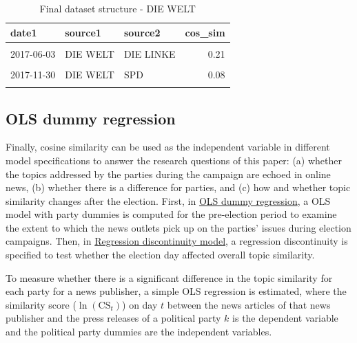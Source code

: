 \documentclass[
  12pt,
]{article}
\begin{document}
\begin{table}[H]

\caption{\label{tab:Dataset structure final}Final dataset structure - DIE WELT \label{table:dataset_structure_final}}
\centering
\fontsize{7}{9}\selectfont
\begin{tabular}[t]{lllr}
\toprule
date1 & source1 & source2 & cos\_sim\\
\midrule
\cellcolor{gray!6}{2017-10-24} & \cellcolor{gray!6}{DIE WELT} & \cellcolor{gray!6}{SPD} & \cellcolor{gray!6}{0.09}\\
2017-06-03 & DIE WELT & DIE LINKE & 0.21\\
\cellcolor{gray!6}{2017-10-09} & \cellcolor{gray!6}{DIE WELT} & \cellcolor{gray!6}{DIE LINKE} & \cellcolor{gray!6}{0.13}\\
2017-11-30 & DIE WELT & SPD & 0.08\\
\cellcolor{gray!6}{2018-01-14} & \cellcolor{gray!6}{DIE WELT} & \cellcolor{gray!6}{CDU} & \cellcolor{gray!6}{0.13}\\
\bottomrule
\end{tabular}
\end{table}

\hypertarget{ols-dummy-regression}{%
\subsection{OLS dummy regression}\label{ols-dummy-regression}}

Finally, cosine similarity can be used as the independent variable in
different model specifications to answer the research questions of this
paper: (a) whether the topics addressed by the parties during the
campaign are echoed in online news, (b) whether there is a difference
for parties, and (c) how and whether topic similarity changes after the
election. First, in \protect\hyperlink{ols-dummy-regression}{OLS dummy
regression}, a OLS model with party dummies is computed for the
pre-election period to examine the extent to which the news outlets pick
up on the parties' issues during election campaigns. Then, in
\protect\hyperlink{regression-discontinuity-model}{Regression
discontinuity model}, a regression discontinuity is specified to test
whether the election day affected overall topic similarity.

To measure whether there is a significant difference in the topic
similarity for each party for a news publisher, a simple OLS regression
is estimated, where the similarity score (\(\ln(\text{CS}_{t})\)) on day
\(t\) between the news articles of that news publisher and the press
releases of a political party \(k\) is the dependent variable and the
political party dummies are the independent variables.
\end{document}
